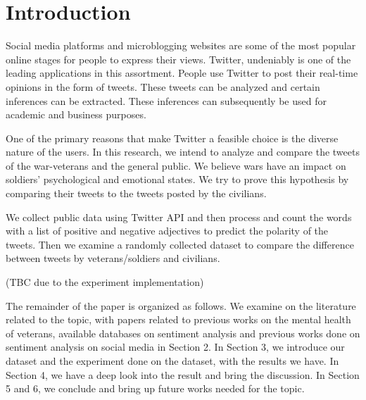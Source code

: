 \section{Introduction}

Social media platforms and microblogging websites are some of the most popular
online stages for people to express their views. Twitter, undeniably is one of
the leading applications in this assortment. People use Twitter to post their
real-time opinions in the form of tweets. These tweets can be analyzed and
certain inferences can be extracted. These inferences can subsequently be used
for academic and business purposes.

One of the primary reasons that make Twitter a feasible choice is the diverse
nature of the users. In this research, we intend to analyze and compare the
tweets of the war-veterans and the general public. We believe wars have an
impact on soldiers’ psychological and emotional states. We try to prove this
hypothesis by comparing their tweets to the tweets posted by the civilians.

We collect public data using Twitter API and then process and count the words
with a list of positive and negative adjectives to predict the polarity of the
tweets. Then we examine a randomly collected dataset to compare the difference
between tweets by veterans/soldiers and civilians.

(TBC due to the experiment implementation)

The remainder of the paper is organized as follows. We examine on
the literature related to the topic, with papers related to previous works on
the mental health of veterans, available databases on sentiment analysis and
previous works done on sentiment analysis on social media in Section 2. In Section 3, we
introduce our dataset and the experiment done on the dataset, with the results
we have. In Section 4, we have a deep look into the result and bring the
discussion. In Section 5 and 6, we conclude and bring up future works needed
for the topic.
